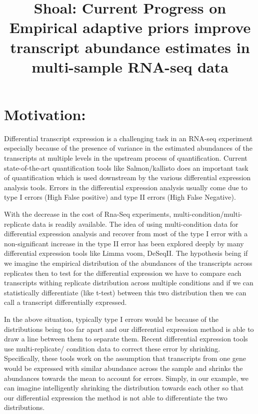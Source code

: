 \documentclass{article}
\begin{document}
\title{{Shoal: Current Progress on Empirical adaptive priors improve transcript abundance estimates in multi-sample RNA-seq data}\\ \bigskip}
\date{}

\maketitle
{}
\setcounter{section}{0}

\section{Motivation:} Differential transcript expression is a challenging task in an RNA-seq experiment especially because of the 
presence of variance in the estimated abundances of the transcripts at multiple levels in the upstream process of quantification.
Current state-of-the-art quantification tools like Salmon/kallisto does an important task of quantification which is used downstream
by the various differential expression analysis tools. Errors in the differential expression analysis usually come due to
type I errors (High False positive) and type II errors (High False Negative). 

With the decrease in the cost of Rna-Seq experiments, multi-condition/multi-replicate data is readily available. The idea of using 
multi-condition data for differential expression analysis and recover from most of the type I error with a non-significant increase 
in the type II error has been explored deeply by many differential expression tools like Limma voom, DeSeqII. The hypothesis 
being if we imagine the empirical distribution of the abundances of the transcripts across replicates then to test for
the differential expression we have to compare each transcripts withing replicate distribution across multiple conditions and if we 
can statistically differentiate (like t-test) between this two distribution then we can call a transcript differentially expressed.

In the above situation, typically type I errors would be because of the distributions being too far apart and our differential
expression method is able to draw a line between them to separate them. Recent differential expression tools use multi-replicate/
condition data to correct these error by shrinking. Specifically, these tools work on the assumption that transcripts from one
gene would be expressed with similar abundance across the sample and shrinks the abundances towards the mean to account for errors.
Simply, in our example, we can imagine intelligently shrinking the distribution towards each other so that our differential expression
the method is not able to differentiate the two distributions.
\end{document}
